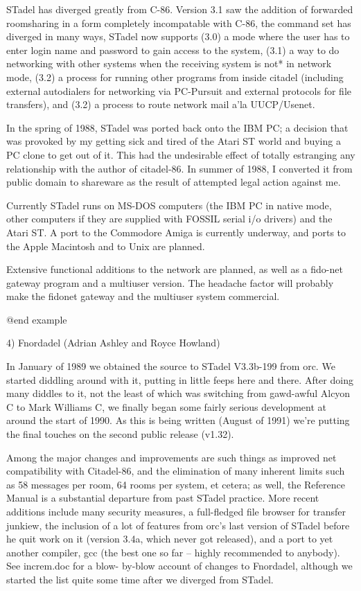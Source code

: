 STadel has diverged greatly from C-86.  Version 3.1 saw the 
addition of forwarded roomsharing in a form completely
incompatable with C-86, the command set has diverged in many ways,
STadel now supports (3.0) a mode where the user has to enter login
name and password to gain access to the system, (3.1) a way to do
networking with other systems when the receiving system is not* in
network mode, (3.2) a process for running other programs from
inside citadel (including external autodialers for networking via
PC-Pursuit and external protocols for file transfers), and (3.2) a
process to route network mail a'la UUCP/Usenet.  

In the spring of 1988, STadel was ported back onto the IBM PC;  a
decision that was provoked by my getting sick and tired of the 
Atari ST world and buying a PC clone to get out of it.  This had 
the undesirable effect of totally estranging any relationship with
the author of citadel-86.  In summer of 1988, I converted it from 
public domain to shareware as the result of attempted legal action
against me.  

Currently STadel runs on MS-DOS computers (the IBM PC in native
mode, other computers if they are supplied with FOSSIL serial i/o
drivers) and the Atari ST.  A port to the Commodore Amiga is
currently underway, and ports to the Apple Macintosh and to Unix
are planned.  

Extensive functional additions to the network are planned, as 
well as a fido-net gateway program and a multiuser version.  The 
headache factor will probably make the fidonet gateway and the
multiuser system commercial.  

@end example

4)  Fnordadel (Adrian Ashley and Royce Howland)

In January of 1989 we obtained the source to STadel V3.3b-199
from orc.  We started diddling around with it, putting in little
feeps here and there.  After doing many diddles to it, not the
least of which was switching from gawd-awful Alcyon C to Mark
Williams C, we finally began some fairly serious development at
around the start of 1990.  As this is being written (August of 1991)
we're putting the final touches on the second public release (v1.32).

Among the major changes and improvements are such things as improved
net compatibility with Citadel-86, and the elimination of many
inherent limits such as 58 messages per room, 64 rooms per system,
et cetera; as well, the Reference Manual is a substantial departure
from past STadel practice.  More recent additions include many
security measures, a full-fledged file browser for transfer junkiew,
the inclusion of a lot of features from orc's last
version of STadel before he quit work on it (version 3.4a, which never
got released), and a port to yet another compiler, gcc (the best one
so far -- highly recommended to anybody).  See increm.doc for a blow-
by-blow account of changes to Fnordadel, although we started the
list quite some time after we diverged from STadel.


